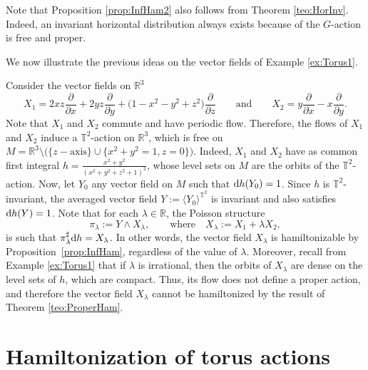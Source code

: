 \documentclass[10pt,a4paper]{amsart}
\newcommand{\R}[1]{\mathbb{R}^{#1}}
\newcommand{\dd}{{\rm d}}
\numberwithin{equation}{section}
\begin{document}
\begin{Remark}
Note that Proposition \ref{prop:InfHam2} also follows from Theorem \ref{teo:HorInv}. Indeed, an invariant horizontal distribution always exists because of the $G$-action is free and proper.
\end{Remark}

We now illustrate the previous ideas on the vector fields of Example \ref{ex:Torus1}.

\begin{Example}\label{ex:Torus2}
Consider the vector fields on $\R{3}$
 \begin{equation*}
 X_{1} = 2xz\frac{\partial}{\partial x} + 2yz\frac{\partial}{\partial y} + \big(1-x^2-y^2+z^2\big)\frac{\partial}{\partial z} \qquad \text{and} \qquad
 X_{2} = y\frac{\partial}{\partial x} - x\frac{\partial}{\partial y}.
 \end{equation*}
Note that $X_1$ and $X_2$ commute and have periodic flow. Therefore, the flows of $X_1$ and $X_2$ induce a $\mathbb{T}^2$-action on $\R{3}$, which is free on $M = \R{3} \setminus \big(\{z-\text{axis}\}\cup\big\{x^2+y^2=1, z = 0\big\}\big)$. Indeed, $X_1$ and $X_2$ have as common first integral $h = \frac{x^2+y^2}{(x^2+y^2+z^2+1)^2}$, whose level sets on $M$ are the orbits of the $\mathbb{T}^2$-action. Now, let $Y_{0}$ any vector field on $M$ such that $\dd h(Y_{0}) = 1$. Since $h$ is $\mathbb{T}^2$-invariant, the averaged vector field $Y := \langle Y_{0}\rangle^{\mathbb{T}^2}$ is invariant and also satisfies $\dd h(Y) = 1$. Note that for each $\lambda \in \mathbb{R}$, the Poisson structure
 \begin{equation*}
 \pi_{\lambda} := Y\wedge X_{\lambda}, \qquad \text{where}\quad X_{\lambda} := X_1 + \lambda X_2,
 \end{equation*}
is such that $\pi_{\lambda}^{\sharp}\dd h = X_{\lambda}$. In other words, the vector field $X_{\lambda}$ is hamiltonizable by Proposition~\ref{prop:InfHam}, regardless of the value of $\lambda$. Moreover, recall from Example \ref{ex:Torus1} that if $\lambda$ is irrational, then the orbits of $X_{\lambda}$ are dense on the level sets of $h$, which are compact. Thus, its flow does not define a proper action, and therefore the vector field $X_{\lambda}$ cannot be hamiltonized by the result of Theorem \ref{teo:ProperHam}.
\end{Example}


 \section{Hamiltonization of torus actions}
\end{document}

